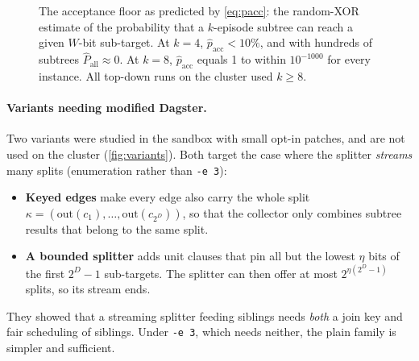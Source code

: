 \documentclass[11pt,a4paper]{article}
\newcommand{\opt}[1]{\texttt{#1}}
\newcommand{\outb}{\mathrm{out}}
\newcommand{\pacc}{\widehat{p}_{\mathrm{acc}}}
\newcommand{\Pall}{\widehat{P}_{\mathrm{all}}}
\begin{document}
\begin{figure}[htbp]
\centering
{}
\caption{The acceptance floor as predicted by \cref{eq:pacc}: the random-XOR estimate of the
probability that a $k$-episode subtree can reach a given $W$-bit sub-target. At $k=4$, $\pacc<10\%$, and with hundreds of
subtrees $\Pall\approx 0$. At $k=8$, $\pacc$ equals 1 to within $10^{-1000}$ for every
instance. All top-down runs on the cluster used $k\ge 8$.}
\label{fig:acceptance}
\end{figure}

\paragraph{Variants needing modified Dagster.}
Two variants were studied in the sandbox with small opt-in patches, and are not used on
the cluster (\cref{fig:variants}). Both target the case where the splitter \emph{streams} many
splits (enumeration rather than \opt{-e 3}):
\begin{itemize}
\item \textbf{Keyed edges} make every edge also carry the whole split
      $\kappa=(\outb(c_1),\dots,\outb(c_{2^D}))$, so that the collector only combines
      subtree results that belong to the same split.
\item \textbf{A bounded splitter} adds unit clauses that pin all but the lowest $\eta$ bits
      of the first $2^D-1$ sub-targets. The splitter can then offer at most
      $2^{\eta(2^D-1)}$ splits, so its stream ends.
\end{itemize}
They showed that a streaming splitter feeding siblings needs \emph{both} a join key and fair
scheduling of siblings. Under \opt{-e 3}, which needs neither, the plain family is simpler
and sufficient.
\end{document}
